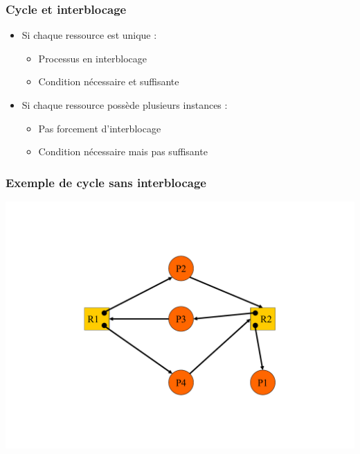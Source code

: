 \begin{frame}
\frametitle{Cycle et interblocage}
\begin{itemize}
\item Si chaque ressource est unique :
\begin{itemize}
\item Processus en interblocage
\item Condition nécessaire et suffisante
\end{itemize}
\item Si chaque ressource possède plusieurs instances :
\begin{itemize}
\item Pas forcement d’interblocage
\item Condition nécessaire mais pas suffisante
\end{itemize}
\end{itemize}
\end{frame}

\begin{frame}
\frametitle{Exemple de cycle sans interblocage}
\includegraphics[width=.8\textwidth]{../illustration/graphe_alloc_ressource_cycle_sans_ib.pdf}
\end{frame}

